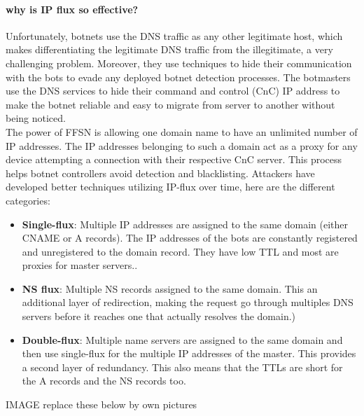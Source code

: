 \paragraph{why is IP flux so effective?} Unfortunately, botnets use the DNS traffic as any other legitimate host, which makes differentiating the legitimate DNS traffic from the illegitimate, a very challenging problem. Moreover, they use techniques to hide their communication with the bots to evade any deployed botnet detection processes. The  botmasters use the DNS services to hide their command and control (CnC) IP address to make the botnet reliable and easy to migrate from server to another without being noticed.\cite{detection3}
\\
The power of FFSN is allowing one domain name to have an unlimited number of IP addresses. The IP addresses belonging to such a domain act as a proxy for any device attempting a connection with their respective CnC server. This process helps botnet controllers avoid detection and blacklisting. Attackers have developed better techniques utilizing IP-flux over time, here are the different categories:
\begin{itemize}[noitemsep]
\item \textbf{Single-flux}: Multiple IP addresses are assigned to the same domain (either CNAME or A records). The IP addresses of the bots are constantly registered and unregistered to the domain record. They have low TTL and most are proxies for master servers.\cite{wiki_ff}.
\item \textbf{NS flux}: Multiple NS records assigned to the same domain. This an additional layer of redirection, making the request go through multiples DNS servers before it reaches one that actually resolves the domain.)
\item \textbf{Double-flux}: Multiple name servers are assigned to the same domain and then use single-flux for the multiple IP addresses of the master. This provides a second layer of redundancy. This also means that the TTLs are short for the A records and the NS records too.
\end{itemize}

IMAGE replace these below by own pictures

